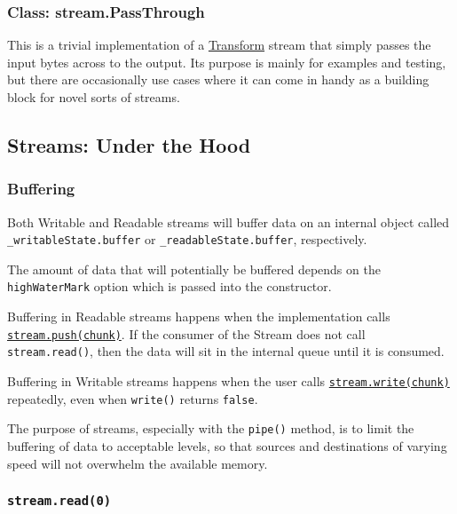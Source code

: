 \subsubsection{Class:
stream.PassThrough}\label{class-stream.passthrough}

This is a trivial implementation of a
\hyperref[streamux5fclassux5fstreamux5ftransform]{Transform} stream that
simply passes the input bytes across to the output. Its purpose is
mainly for examples and testing, but there are occasionally use cases
where it can come in handy as a building block for novel sorts of
streams.

\subsection{Streams: Under the Hood}\label{streams-under-the-hood}

\subsubsection{Buffering}\label{buffering}

Both Writable and Readable streams will buffer data on an internal
object called \texttt{\_writableState.buffer} or
\texttt{\_readableState.buffer}, respectively.

The amount of data that will potentially be buffered depends on the
\texttt{highWaterMark} option which is passed into the constructor.

Buffering in Readable streams happens when the implementation calls
\hyperref[streamux5freadableux5fpushux5fchunkux5fencoding]{\texttt{stream.push(chunk)}}.
If the consumer of the Stream does not call \texttt{stream.read()}, then
the data will sit in the internal queue until it is consumed.

Buffering in Writable streams happens when the user calls
\hyperref[streamux5fwritableux5fwriteux5fchunkux5fencodingux5fcallback]{\texttt{stream.write(chunk)}}
repeatedly, even when \texttt{write()} returns \texttt{false}.

The purpose of streams, especially with the \texttt{pipe()} method, is
to limit the buffering of data to acceptable levels, so that sources and
destinations of varying speed will not overwhelm the available memory.

\subsubsection{\texorpdfstring{\texttt{stream.read(0)}}{stream.read(0)}}\label{stream.read0}

